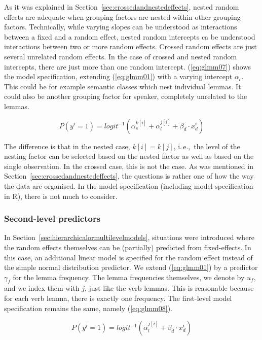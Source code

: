 \documentclass[a4paper,12pt]{article}
\newcommand{\ie}{i.\,e.,\ }
\begin{document}
As it was explained in Section~\ref{sec:crossedandnestedeffects}, nested random effects are adequate when grouping factors are nested within other grouping factors.
Technically, while varying slopes can be understood as interactions between a fixed and a random effect, nested random intercepts ca be understood interactions between two or more random effects.
Crossed random effects are just several unrelated random effects.
In the case of crossed and nested random intercepts, there are just more than one random intercept.
(\ref{eq:glmm07}) shows the model specification, extending (\ref{eq:glmm01}) with a varying intercept $\alpha_c$.
This could be for example semantic classes which nest individual lemmas.
It could also be another grouping factor for speaker, completely unrelated to the lemmas.

\begin{equation}
  P(y^i=1)=logit^{-1}(\alpha_{s}^{k[i]}+\alpha_{l}^{j[i]}+\beta_d\cdot x_d^i)
  \label{eq:glmm07}
\end{equation}

The difference is that in the nested case, $k[i]=k[j]$, \ie the level of the nesting factor can be selected based on the nested factor as well as based on the single observation.
In the crossed case, this is not the case.
As was mentioned in Section~\ref{sec:crossedandnestedeffects}, the questions is rather one of how the way the data are organised.
In the model specification (including model specification in R), there is not much to consider.

\subsubsection{Second-level predictors}
\label{sec:secondlevelpredictors}

In Section~\ref{sec:hierarchicalormultilevelmodels}, situations were introduced where the random effects themselves can be (partially) predicted from fixed-effects.
In this case, an additional linear model is specified for the random effect instead of the simple normal distribution predictor.
We extend (\ref{eq:glmm01}) by a predictor $\gamma_f$ for the lemma frequency.
The lemma frequencies themselves, we denote by $u_f$, and we index them with $j$, just like the verb lemmas.
This is reasonable because for each verb lemma, there is exactly one frequency.
The first-level model specification remains the same, namely (\ref{eq:glmm08}).

\begin{equation}
  P(y^i=1)=logit^{-1}(\alpha_{l}^{j[i]}+\beta_d\cdot x_d^i)
  \label{eq:glmm08}
\end{equation}
\end{document}
